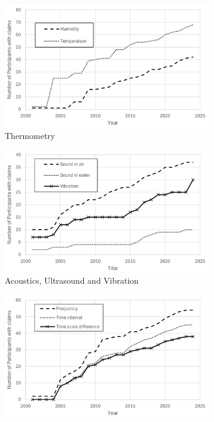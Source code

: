 \documentclass[
	a4paper, %
	10pt, %
	unnumberedsections, %
	twoside, %
]{LTJournalArticle}
\begin{document}
\begin{figure}
\centering
\begin{subfigure}[b]{0.48\textwidth}
    \includegraphics[width=\textwidth]{figures/Participants_Thermometry.png}
    \caption{Thermometry}
    \label{fig:t_vs_time}
\end{subfigure}
\hfill
\begin{subfigure}[b]{0.48\textwidth}
    \includegraphics[width=\textwidth]{figures/Participants_Acoustics.png}
    \caption{Acoustics, Ultrasound and Vibration}
    \label{fig:auv_vs_time}
\end{subfigure}
\hfill
\begin{subfigure}[b]{0.48\textwidth}
    \includegraphics[width=\textwidth]{figures/Participants_Time.png}

\end{subfigure}
\end{figure}
\end{document}
